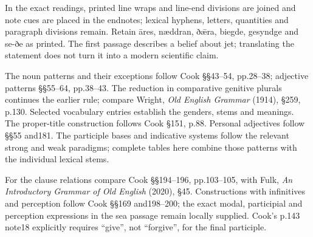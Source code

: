 In the exact readings, printed line wraps and line-end divisions are joined and note cues are placed in the endnotes; lexical hyphens, letters, quantities and paragraph divisions remain. Retain āres, næddran, ðǣra, biegde, gesyndge and se-ðe as printed. The first passage describes a belief about jet; translating the statement does not turn it into a modern scientific claim.

The noun patterns and their exceptions follow Cook §§43–54, pp.28–38; adjective patterns §§55–64, pp.38–43. The reduction in comparative genitive plurals continues the earlier rule; compare Wright, \emph{Old English Grammar} (1914), §259, p.130. Selected vocabulary entries establish the genders, stems and meanings. The proper-title construction follows Cook §151, p.88. Personal adjectives follow §§55 and181. The participle bases and indicative systems follow the relevant strong and weak paradigms; complete tables here combine those patterns with the individual lexical stems.

For the clause relations compare Cook §§194–196, pp.103–105, with Fulk, \emph{An Introductory Grammar of Old English} (2020), §45. Constructions with infinitives and perception follow Cook §§169 and198–200; the exact modal, participial and perception expressions in the sea passage remain locally supplied. Cook’s p.143 note18 explicitly requires “give”, not “forgive”, for the final participle.

\endgroup

